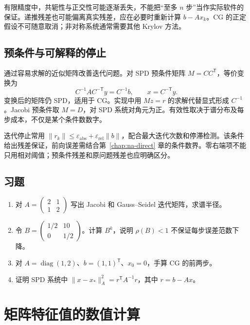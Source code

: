 \documentclass[UTF8,12pt,a4paper,fontset=fandol]{ctexbook}
\begin{document}
有限精度中，共轭性与正交性可能逐渐丢失，不能把“至多 $n$ 步”当作实际软件的保证。递推残差也可能偏离真实残差，应在必要时重新计算 $b-Ax_k$。CG 的正定假设不可随意取消；非对称系统通常需要其他 Krylov 方法。

\section{预条件与可解释的停止}
通过容易求解的近似矩阵改善迭代问题。对 SPD 预条件矩阵 $M=CC^{\mathsf T}$，等价变换为
\[
 C^{-1}AC^{-\mathsf T}y=C^{-1}b,\qquad x=C^{-\mathsf T}y.
\]
变换后的矩阵仍 SPD，适用于 CG。实现中用 $Mz=r$ 的求解代替显式形成 $C^{-1}$。Jacobi 预条件取 $M=D$，对 SPD 系统对角元为正。有效性取决于谱分布及每步成本，不仅是某个条件数数字。

迭代停止常用 $\|r_k\|\le\varepsilon_{\mathrm{abs}}+\varepsilon_{\mathrm{rel}}\|b\|$，配合最大迭代次数和停滞检测。该条件给出残差保证，前向误差需结合第~\ref{chap:na-direct} 章的条件数界。零右端项不能只用相对阈值；预条件残差和原问题残差也应明确区分。

\section{习题}
\begin{enumerate}[label=\arabic*.]
\item\label{exr:na-iter-jacobi} 对 $A=\begin{pmatrix}2&1\\1&2\end{pmatrix}$ 写出 Jacobi 和 Gauss--Seidel 迭代矩阵，求谱半径。
\item\label{exr:na-iter-nonnormal} 令 $B=\begin{pmatrix}1/2&10\\0&1/2\end{pmatrix}$。计算 $B^k$，说明 $\rho(B)<1$ 不保证每步误差范数下降。
\item\label{exr:na-iter-cg} 对 $A=\operatorname{diag}(1,2)$、$b=(1,1)^{\mathsf T}$、$x_0=0$，手算 CG 的前两步。
\item\label{exr:na-iter-energy} 证明 SPD 系统中 $\|x-x_*\|_A^2=r^{\mathsf T}A^{-1}r$，其中 $r=b-Ax$。
\end{enumerate}

\chapter{矩阵特征值的数值计算}
\label{chap:na-eigen}
\end{document}
